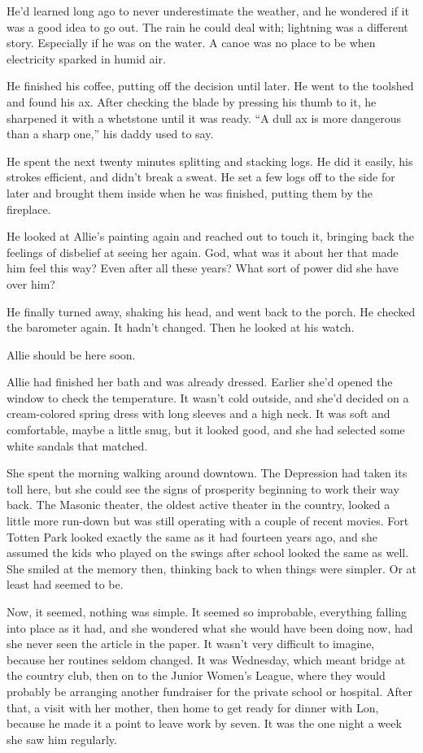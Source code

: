 \documentclass[10pt, twoside, openright]{book}
\begin{document}
He'd learned long ago to never underestimate the weather, and he
wondered if it was a good idea to go out. The rain he could deal with;
lightning was a different story. Especially if he was on the water. A
canoe was no place to be when electricity sparked in humid air.

He finished his coffee, putting off the decision until later. He went to
the toolshed and found his ax. After checking the blade by pressing his
thumb to it, he sharpened it with a whetstone until it was ready. ``A
dull ax is more dangerous than a sharp one,'' his daddy used to say.

He spent the next twenty minutes splitting and stacking logs. He did it
easily, his strokes efficient, and didn't break a sweat. He set a few
logs off to the side for later and brought them inside when he was
finished, putting them by the fireplace.

He looked at Allie's painting again and reached out to touch it,
bringing back the feelings of disbelief at seeing her again. God, what
was it about her that made him feel this way? Even after all these
years? What sort of power did she have over him?

He finally turned away, shaking his head, and went back to the porch. He
checked the barometer again. It hadn't changed. Then he looked at his
watch.


Allie should be here soon.


Allie had finished her bath and was already dressed. Earlier she'd
opened the window to check the temperature. It wasn't cold outside, and
she'd decided on a cream-colored spring dress with long sleeves and a
high neck. It was soft and comfortable, maybe a little snug, but it
looked good, and she had selected some white sandals that matched.

She spent the morning walking around downtown. The Depression had taken
its toll here, but she could see the signs of prosperity beginning to
work their way back. The Masonic theater, the oldest active theater in
the country, looked a little more run-down but was still operating with
a couple of recent movies. Fort Totten Park looked exactly the same as
it had fourteen years ago, and she assumed the kids who played on the
swings after school looked the same as well. She smiled at the memory
then, thinking back to when things were simpler. Or at least had seemed
to be.

Now, it seemed, nothing was simple. It seemed so improbable, everything
falling into place as it had, and she wondered what she would have been
doing now, had she never seen the article in the paper. It wasn't very
difficult to imagine, because her routines seldom changed. It was
Wednesday, which meant bridge at the country club, then on to the Junior
Women's League, where they would probably be arranging another
fund\-raiser for the private school or hospital. After that, a visit with
her mother, then home to get ready for dinner with Lon, because he made
it a point to leave work by seven. It was the one night a week she saw
him regularly.
\end{document}
